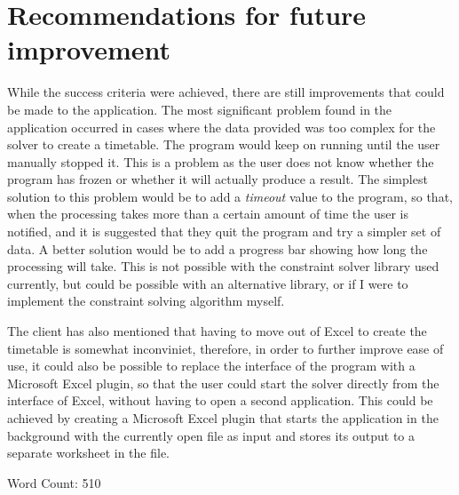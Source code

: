 \documentclass[a4paper, 12pt]{article}
\begin{document}
\section{Recommendations for future improvement}

While the success criteria were achieved, there are still improvements that could be made to
the application. The most significant problem found in the application occurred in cases
where the data provided was too complex for the solver to create a timetable. The program
would keep on running until the user manually stopped it. This is a problem as the user
does not know whether the program has frozen or whether it will actually produce a result.
The simplest solution to this problem would be to add a \emph{timeout} value to the program,
so that, when the processing takes more than a certain amount of time the user is notified,
and it is suggested that they quit the program and try a simpler set of data. A better
solution would be to add a progress bar showing how long the processing will take. This is
not possible with the constraint solver library used currently, but could be possible with
an alternative library, or if I were to implement the constraint solving algorithm myself. 

The client has also mentioned that having to move out of Excel to create the timetable is
somewhat inconviniet, therefore, in order to further improve ease of use, it could also be
possible to replace the interface of the program with a Microsoft Excel plugin, so that the
user could start the solver directly from the interface of Excel, without having to open a
second application. This could be achieved by creating a Microsoft Excel plugin that starts
the application in the background with the currently open file as input and stores its
output to a separate worksheet in the file.

Word Count: 510
\end{document}
